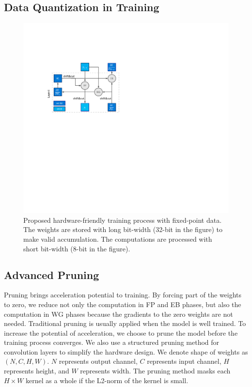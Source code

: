 \subsection{Data Quantization in Training}

\begin{figure}[tb]
\centering 
\includegraphics[width=0.9\columnwidth]{figures/fixed_train.pdf}
\caption{Proposed hardware-friendly training process with fixed-point data. The weights are stored with long bit-width (32-bit in the figure) to make valid accumulation. The computations are processed with short bit-width (8-bit in the figure).}
\label{fig:fixed_train}
\end{figure}

\subsection{Advanced Pruning}\label{sec:training:prune}

Pruning brings acceleration potential to training. By forcing part of the weights to zero, we reduce not only the computation in FP and EB phases, but also the computation in WG phases because the gradients to the zero weights are not needed. Traditional pruning is usually applied when the model is well trained. To increase the potential of acceleration, we choose to prune the model before the training process converges. We also use a structured pruning method for convolution layers to simplify the hardware design. We denote shape of weights as $(N, C, H, W)$. $N$ represents output channel, $C$ represents input channel, $H$ represents height, and $W$ represents width. The pruning method masks each $H\times W$ kernel as a whole if the L2-norm of the kernel is small. 

